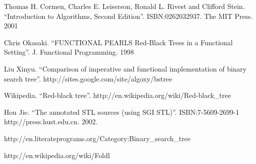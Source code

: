 \documentclass{article}
\begin{document}
\begin{thebibliography}{99}

Thomas H. Cormen, Charles E. Leiserson, Ronald L. Rivest and Clifford Stein. 
``Introduction to Algorithms, Second Edition''. ISBN:0262032937. The MIT Press. 2001

Chris Okasaki. ``FUNCTIONAL PEARLS Red-Black Trees in a Functional Setting''. J. Functional Programming. 1998

Liu Xinyu. ``Comparison of imperative and functional implementation of binary search tree''. http://sites.google.com/site/algoxy/bstree

Wikipedia. ``Red-black tree''. http://en.wikipedia.org/wiki/Red-black\_tree

Hou Jie. ``The annotated STL sources (using SGI STL)''. ISBN:7-5609-2699-1 http://press.hust.edu.cn. 2002.

http://en.literateprograms.org/Category:Binary\_search\_tree

http://en.wikipedia.org/wiki/Foldl

\end{thebibliography}

\ifx\wholebook\relax\else
\end{document}
